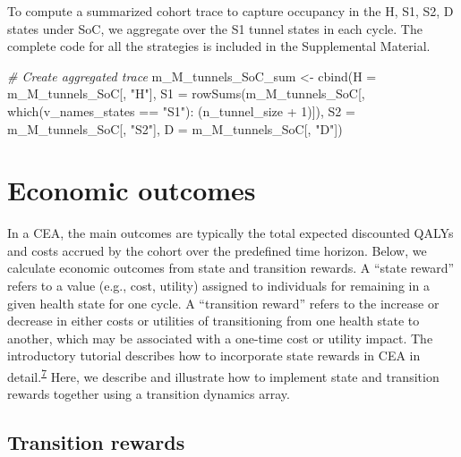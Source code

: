 \documentclass[
]{article}
\newenvironment{Shaded}{\begin{snugshade}}{\end{snugshade}}
\newcommand{\AttributeTok}[1]{\textcolor[rgb]{0.77,0.63,0.00}{#1}}
\newcommand{\CommentTok}[1]{\textcolor[rgb]{0.56,0.35,0.01}{\textit{#1}}}
\newcommand{\DecValTok}[1]{\textcolor[rgb]{0.00,0.00,0.81}{#1}}
\newcommand{\FunctionTok}[1]{\textcolor[rgb]{0.00,0.00,0.00}{#1}}
\newcommand{\NormalTok}[1]{#1}
\newcommand{\OtherTok}[1]{\textcolor[rgb]{0.56,0.35,0.01}{#1}}
\newcommand{\SpecialCharTok}[1]{\textcolor[rgb]{0.00,0.00,0.00}{#1}}
\newcommand{\StringTok}[1]{\textcolor[rgb]{0.31,0.60,0.02}{#1}}
\begin{document}
To compute a summarized cohort trace to capture occupancy in the H, S1, S2, D states under SoC, we aggregate over the S1 tunnel states in each cycle. The complete code for all the strategies is included in the Supplemental Material.

\begin{Shaded}
\begin{Highlighting}[]
\CommentTok{\# Create aggregated trace}
\NormalTok{m\_M\_tunnels\_SoC\_sum }\OtherTok{\textless{}{-}} \FunctionTok{cbind}\NormalTok{(}\AttributeTok{H =}\NormalTok{ m\_M\_tunnels\_SoC[, }\StringTok{"H"}\NormalTok{], }
                             \AttributeTok{S1 =} \FunctionTok{rowSums}\NormalTok{(m\_M\_tunnels\_SoC[, }\FunctionTok{which}\NormalTok{(v\_names\_states }\SpecialCharTok{==} \StringTok{"S1"}\NormalTok{)}\SpecialCharTok{:}
\NormalTok{                                                            (n\_tunnel\_size }\SpecialCharTok{+} \DecValTok{1}\NormalTok{)]), }
                             \AttributeTok{S2 =}\NormalTok{ m\_M\_tunnels\_SoC[, }\StringTok{"S2"}\NormalTok{],}
                             \AttributeTok{D =}\NormalTok{ m\_M\_tunnels\_SoC[, }\StringTok{"D"}\NormalTok{])}
\end{Highlighting}
\end{Shaded}

\hypertarget{economic-outcomes}{%
\section{Economic outcomes}\label{economic-outcomes}}

In a CEA, the main outcomes are typically the total expected discounted QALYs and costs accrued by the cohort over the predefined time horizon. Below, we calculate economic outcomes from state and transition rewards. A ``state reward'' refers to a value (e.g., cost, utility) assigned to individuals for remaining in a given health state for one cycle. A ``transition reward'' refers to the increase or decrease in either costs or utilities of transitioning from one health state to another, which may be associated with a one-time cost or utility impact. The introductory tutorial describes how to incorporate state rewards in CEA in detail.\textsuperscript{\protect\hyperlink{ref-Alarid-Escudero2022b}{7}} Here, we describe and illustrate how to implement state and transition rewards together using a transition dynamics array.

\hypertarget{transition-rewards}{%
\subsection{Transition rewards}\label{transition-rewards}}
\end{document}
